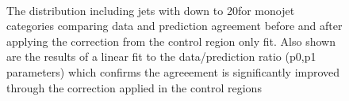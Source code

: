 \begin{figure}[tbhp]
    \begin{center}
         ~~
        \\
        \caption{The \bdphi distribution including jets with \pt down to 20\GeV for monojet categories comparing data and prediction agreement before and after applying the correction from the control region only fit. Also shown are the results of a linear fit to the data/prediction ratio (p0,p1 parameters) which confirms the agreeement is significantly improved through the correction applied in the control regions}
    \end{center}
\end{figure}
